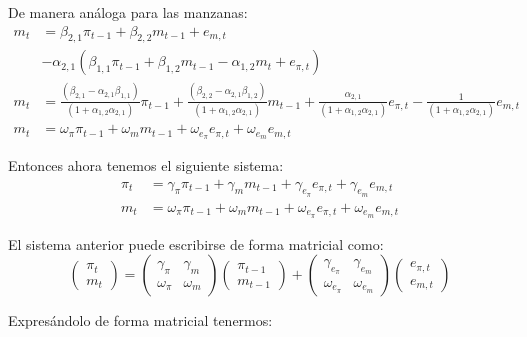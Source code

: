 \documentclass[
]{book}
\begin{document}
De manera análoga para las manzanas:
\begin{align}
m_{t} &=\beta_{2,1}\pi_{t-1}+\beta_{2,2}m_{t-1}+e_{m,t}\\
        &- \alpha_{2,1}(\beta_{1,1}\pi_{t-1}+\beta_{1,2}m_{t-1}-\alpha_{1,2}m_t+e_{\pi,t})\\
        m_{t} &=\frac{(\beta_{2,1}-\alpha_{2,1}\beta_{1,1})}{(1+\alpha_{1,2}\alpha_{2,1})}\pi_{t-1}+ \frac{(\beta_{2,2}-\alpha_{2,1}\beta_{1,2})}{(1+\alpha_{1,2}\alpha_{2,1})}m_{t-1}+\frac{\alpha_{2,1}}{(1+\alpha_{1,2}\alpha_{2,1})}e_{\pi,t}- \frac{1}{(1+\alpha_{1,2}\alpha_{2,1})}e_{m,t}\\
 m_{t}&=\omega_{\pi}\pi_{t-1}+\omega_{m}m_{t-1}+\omega_{e_{\pi}}e_{\pi,t}+\omega_{e_{m}}e_{m,t}       
\end{align}

Entonces ahora tenemos el siguiente sistema:
\begin{align}
\pi_{t}&=\gamma_{\pi}\pi_{t-1}+\gamma_{m}m_{t-1}+\gamma_{e_{\pi}}e_{\pi,t}+\gamma_{e_{m}}e_{m,t}\\   
 m_{t}&=\omega_{\pi}\pi_{t-1}+\omega_{m}m_{t-1}+\omega_{e_{\pi}}e_{\pi,t}+\omega_{e_{m}}e_{m,t}       
\end{align}

El sistema anterior puede escribirse de forma matricial como:
\begin{equation}
    \left( \begin{array}{c}
    \pi_{t} \\
      m_{t} 
    \end{array}\right)=\left( \begin{array}{cc}
 \gamma_{\pi} & \gamma_{m}\\
 \omega_{\pi} & \omega_{m}
    \end{array}
    \right) \left( \begin{array}{c}
    \pi_{t-1}\\
      m_{t-1}
    \end{array}
    \right) +
\left( \begin{array}{cc}
 \gamma_{e_{\pi}} & \gamma_{e_{m}}\\
 \omega_{e_{\pi}} & \omega_{e_{m}}
    \end{array}
    \right) \left( \begin{array}{c}
    e_{\pi,t}\\
    e_{m,t} 
    \end{array}
    \right) 
\end{equation}

Expresándolo de forma matricial tenermos:
\end{document}
